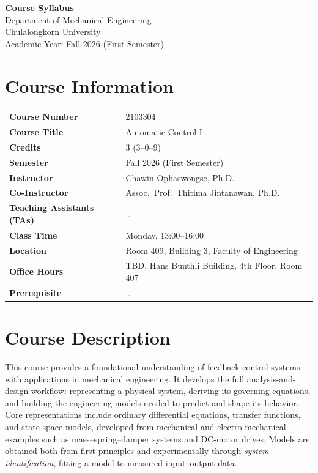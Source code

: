 \documentclass[11pt]{article}
\begin{document}
\begin{center}
    {\LARGE\bfseries Course Syllabus}\\[6pt]
    {\large Department of Mechanical Engineering}\\
    {\large Chulalongkorn University}\\[4pt]
    {\normalsize Academic Year: Fall 2026 (First Semester)}
\end{center}

\section*{\color{brandred}Course Information}
\vspace{-2pt}
\begin{tabular}{@{}>{\bfseries}L{5.0cm} L{11.0cm}@{}}
    Course Number   & 2103304 \\
    Course Title    & Automatic Control I \\
    Credits         & 3 (3--0--9) \\
    Semester        & Fall 2026 (First Semester) \\
    Instructor      & Chawin Ophaswongse, Ph.D. \\
    Co-Instructor   & Assoc.\ Prof.\ Thitima Jintanawan, Ph.D. \\
    Teaching Assistants (TAs) & \dots\\
    Class Time      & Monday, 13:00--16:00 \\
    Location        & Room 409, Building 3, Faculty of Engineering \\
    Office Hours    & TBD, Hans Bunthli Building, 4th Floor, Room 407 \\
    Prerequisite    & \dots \\
\end{tabular}

\section{Course Description}
This course provides a foundational understanding of feedback control systems with
applications in mechanical engineering. It develops the full analysis-and-design
workflow: representing a physical system, deriving its governing equations, and
building the engineering models needed to predict and shape its behavior. Core
representations include ordinary differential equations, transfer functions, and
state-space models, developed from mechanical and electro-mechanical examples such
as mass--spring--damper systems and DC-motor drives. Models are obtained both from
first principles and experimentally through \emph{system identification}, fitting a
model to measured input--output data.
\end{document}
